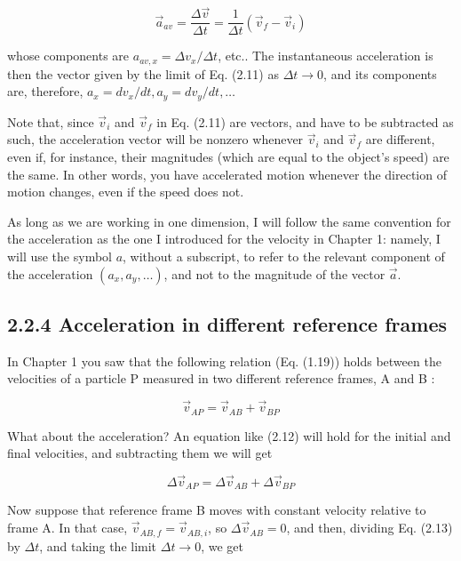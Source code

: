 \documentclass[10pt]{article}
\begin{document}
\begin{equation*}
\vec{a}_{a v}=\frac{\Delta \vec{v}}{\Delta t}=\frac{1}{\Delta t}\left(\vec{v}_{f}-\vec{v}_{i}\right) \tag{2.11}
\end{equation*}


whose components are $a_{a v, x}=\Delta v_{x} / \Delta t$, etc.. The instantaneous acceleration is then the vector given by the limit of Eq. (2.11) as $\Delta t \rightarrow 0$, and its components are, therefore, $a_{x}=d v_{x} / d t, a_{y}=d v_{y} / d t, \ldots$

Note that, since $\vec{v}_{i}$ and $\vec{v}_{f}$ in Eq. (2.11) are vectors, and have to be subtracted as such, the acceleration vector will be nonzero whenever $\vec{v}_{i}$ and $\vec{v}_{f}$ are different, even if, for instance, their magnitudes (which are equal to the object's speed) are the same. In other words, you have accelerated motion whenever the direction of motion changes, even if the speed does not.

As long as we are working in one dimension, I will follow the same convention for the acceleration as the one I introduced for the velocity in Chapter 1: namely, I will use the symbol $a$, without a subscript, to refer to the relevant component of the acceleration $\left(a_{x}, a_{y}, \ldots\right)$, and not to the magnitude of the vector $\vec{a}$.

\subsection*{2.2.4 Acceleration in different reference frames}
In Chapter 1 you saw that the following relation (Eq. (1.19)) holds between the velocities of a particle P measured in two different reference frames, A and B :


\begin{equation*}
\vec{v}_{A P}=\vec{v}_{A B}+\vec{v}_{B P} \tag{2.12}
\end{equation*}


What about the acceleration? An equation like (2.12) will hold for the initial and final velocities, and subtracting them we will get


\begin{equation*}
\Delta \vec{v}_{A P}=\Delta \vec{v}_{A B}+\Delta \vec{v}_{B P} \tag{2.13}
\end{equation*}


Now suppose that reference frame B moves with constant velocity relative to frame A. In that case, $\vec{v}_{A B, f}=\vec{v}_{A B, i}$, so $\Delta \vec{v}_{A B}=0$, and then, dividing Eq. (2.13) by $\Delta t$, and taking the limit $\Delta t \rightarrow 0$, we get
\end{document}
